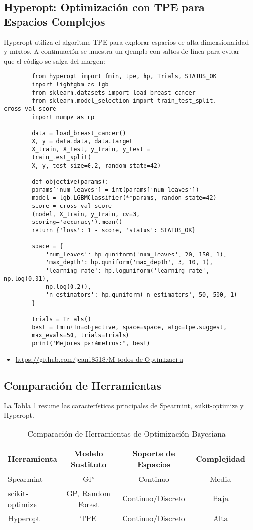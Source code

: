 \documentclass[12pt]{article}
\begin{document}
	\subsection{Hyperopt: Optimización con TPE para Espacios Complejos}
	Hyperopt utiliza el algoritmo TPE para explorar espacios de alta dimensionalidad y mixtos. A continuación se muestra un ejemplo con saltos de línea para evitar que el código se salga del margen:
	\begin{verbatim}
		from hyperopt import fmin, tpe, hp, Trials, STATUS_OK
		import lightgbm as lgb
		from sklearn.datasets import load_breast_cancer
		from sklearn.model_selection import train_test_split, cross_val_score
		import numpy as np
		
		data = load_breast_cancer()
		X, y = data.data, data.target
		X_train, X_test, y_train, y_test = 
		train_test_split(
		X, y, test_size=0.2, random_state=42)
		
		def objective(params):
		params['num_leaves'] = int(params['num_leaves'])
		model = lgb.LGBMClassifier(**params, random_state=42)
		score = cross_val_score
		(model, X_train, y_train, cv=3,
		scoring='accuracy').mean()
		return {'loss': 1 - score, 'status': STATUS_OK}
		
		space = {
			'num_leaves': hp.quniform('num_leaves', 20, 150, 1),
			'max_depth': hp.quniform('max_depth', 3, 10, 1),
			'learning_rate': hp.loguniform('learning_rate', np.log(0.01), 
			np.log(0.2)),
			'n_estimators': hp.quniform('n_estimators', 50, 500, 1)
		}
		
		trials = Trials()
		best = fmin(fn=objective, space=space, algo=tpe.suggest, 
		max_evals=50, trials=trials)
		print("Mejores parámetros:", best)
	\end{verbatim}
	\begin{itemize}
		\item \url{https://github.com/jean18518/M-todos-de-Optimizaci-n}
	\end{itemize}
	\lipsum[19]
	
	\subsection{Comparación de Herramientas}
	La Tabla \ref{tab:herramientas} resume las características principales de Spearmint, scikit-optimize y Hyperopt.
	
	\begin{table}[H]
		\centering
		\caption{Comparación de Herramientas de Optimización Bayesiana}
		\begin{tabular}{|l|c|c|c|}
			\hline
			\textbf{Herramienta} & \textbf{Modelo Sustituto} & \textbf{Soporte de Espacios} & \textbf{Complejidad} \\
			\hline
			Spearmint & GP & Continuo & Media \\
			scikit-optimize & GP, Random Forest & Continuo/Discreto & Baja \\
			Hyperopt & TPE & Continuo/Discreto & Alta \\
			\hline
		\end{tabular}
		\label{tab:herramientas}
	\end{table}
	\lipsum[20]
	
\end{document}
